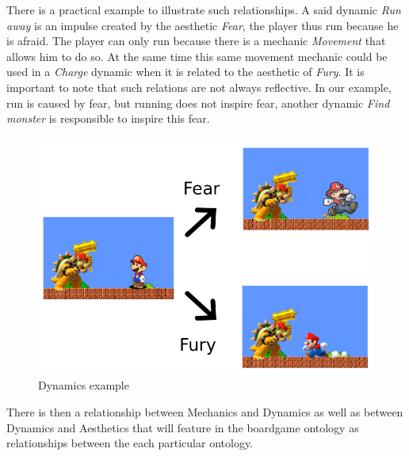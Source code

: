  There is a practical example to illustrate such relationships. A said dynamic \textit{Run away} is an impulse created by the aesthetic \textit{Fear}, the player thus run because he is afraid. The player can only run because there is a mechanic \textit{Movement} that allows him to do so. At the same time this same movement mechanic could be used in a \textit{Charge} dynamic when it is related to the aesthetic of \textit{Fury}. It is important to note that such relations are not always reflective. In our example, run is caused by fear, but running does not inspire fear, another dynamic \textit{Find monster} is responsible to inspire this fear.
 
 \begin{figure}[h!]
     \centering 
     \includegraphics[scale = 0.55]{Images/MarioDiagram.png}
     \caption{Dynamics example}
     \label{fig:dynamicexample}
 \end{figure}

There is then a relationship between Mechanics and Dynamics as well as between Dynamics and Aesthetics that will feature in the boardgame ontology as relationships between the each particular ontology.